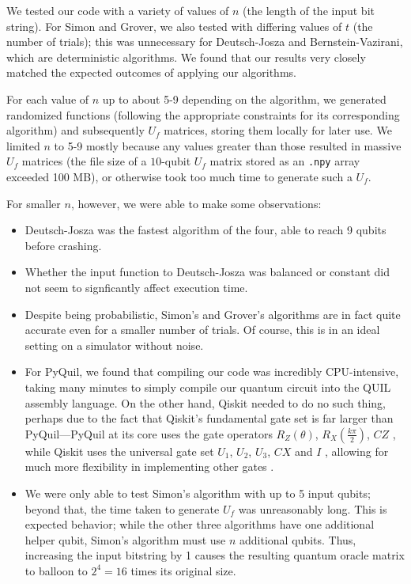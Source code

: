 \documentclass[12pt]{article}
\begin{document}
We tested our code with a variety of values of $n$ (the length of the input bit string).
For Simon and Grover, we also tested with differing values of $t$ (the number of trials); this was unnecessary for Deutsch-Josza and Bernstein-Vazirani, which are deterministic algorithms.
We found that our results very closely matched the expected outcomes of applying our algorithms.

For each value of $n$ up to about 5-9 depending on the algorithm, we generated randomized functions (following the appropriate constraints for its corresponding algorithm) and subsequently $U_f$ matrices, storing them locally for later use.
We limited $n$ to 5-9 mostly because any values greater than those resulted in massive $U_f$ matrices (the file size of a $10$-qubit $U_f$ matrix stored as an \texttt{.npy} array exceeded 100 MB), or otherwise took too much time to generate such a $U_f$.

For smaller $n$, however, we were able to make some observations:

\begin{itemize}
    \item Deutsch-Josza was the fastest algorithm of the four, able to reach 9 qubits before crashing.
    \item Whether the input function to Deutsch-Josza was balanced or constant did not seem to signficantly affect execution time.
    \item Despite being probabilistic, Simon's and Grover's algorithms are in fact quite accurate even for a smaller number of trials. Of course, this is in an ideal setting on a simulator without noise.
    \item For PyQuil, we found that compiling our code was incredibly CPU-intensive, taking many minutes to simply compile our quantum circuit into the QUIL assembly language.
        On the other hand, Qiskit needed to do no such thing, perhaps due to the fact that Qiskit's fundamental gate set is far larger than PyQuil---PyQuil at its core uses the gate operators $R_Z(\theta)$, $R_X(\frac{k\pi}{2})$, $CZ$ \cite{rigetti}, while Qiskit uses the universal gate set $U_1$, $U_2$, $U_3$, $CX$ and $I$ \cite{gates}, allowing for much more flexibility in implementing other gates \cite{opt}.
    \item We were only able to test Simon's algorithm with up to 5 input qubits; beyond that, the time taken to generate $U_f$ was unreasonably long. This is expected behavior; while the other three algorithms have one additional helper qubit, Simon's algorithm must use $n$ additional qubits. Thus, increasing the input bitstring by 1 causes the resulting quantum oracle matrix to balloon to $2^4 = 16$ times its original size.
\end{itemize}
\end{document}
